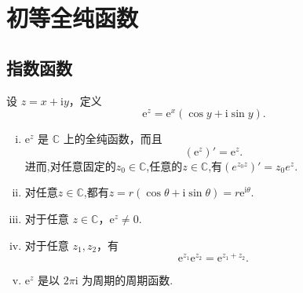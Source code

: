 \documentclass[../../main.tex]{subfiles}%
\begin{document}
\section{初等全纯函数}

\subsection{指数函数}

\begin{definition}[指数函数]
设 \( z = x + \mathrm{i}y \)，定义
\[
\mathrm{e}^z = \mathrm{e}^x (\cos y + \mathrm{i}\sin y).
\]
\end{definition}

\begin{proposition}\label{proposition:指数函数的性质}
\begin{enumerate}[(i)]
\item \( \mathrm{e}^z \) 是 \( \mathbb{C} \) 上的全纯函数，而且
\[
(\mathrm{e}^z)' = \mathrm{e}^z.
\]
进而,对任意固定的$z_0\in \mathbb{C}$,任意的$z\in \mathbb{C}$,有$(e^{z_0z})'=z_0e^{z}.$

\item 对任意\( z \in \mathbb{C} \),都有\( z = r(\cos\theta + \mathrm{i}\sin\theta)= r\mathrm{e}^{\mathrm{i}\theta} \).

\item 对于任意 \( z \in \mathbb{C} \)，\( \mathrm{e}^z \neq 0 \). 

\item 对于任意 \( z_1, z_2 \)，有
\[
\mathrm{e}^{z_1} \mathrm{e}^{z_2} = \mathrm{e}^{z_1 + z_2}.
\]

\item \( \mathrm{e}^z \) 是以 \( 2\pi\mathrm{i} \) 为周期的周期函数.
\end{enumerate}
\end{proposition}
\end{document}
